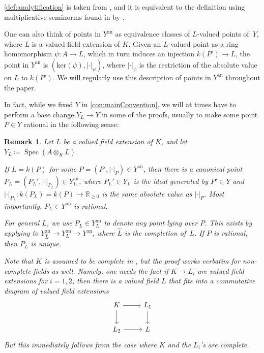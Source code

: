 \documentclass[12pt,reqno,a4paper]{amsart}
\theoremstyle{theoremstyle}
\theoremstyle{examplestyle}
\newtheorem{remark}[theorem]{Remark}
\theoremstyle{algorithmstyle}
\newcommand{\RR}{\mathbb{R}}
\newcommand{\an}{{\mathrm{an}}}
\DeclareMathOperator{\Spec}{Spec}
\begin{document}
\cref{def:analytification} is taken from \cite{Nicaise2016}, and it is equivalent to the definition using multiplicative seminorms found in \cite{Gubler2013,Temkin15,BPR2016} by \cite[Remark~2.2]{Gubler2013}.

One can also think of points in $Y^{\an}$ as equivalence classes of $L$-valued points of~$Y$, where $L$ is a valued field extension of $K$. Given an $L$-valued point as a ring homomorphism $\psi\colon A\to L$, which in turn induces an injection $k(P')\to L$, the point in $Y^{\an}$ is $(\mathrm{ker}(\psi), |\cdot|_\psi)$, where $|\cdot|_\psi$ is the restriction of the absolute value on $L$ to $k(P')$.  We will regularly use this description of points in $Y^\an$ throughout the paper.

%

\smallskip

In fact, while we fixed $Y$ in \cref{con:mainConvention}, we will at times have to perform a base change $Y_L\rightarrow Y$ in some of the proofs, usually to make some point $P\in Y$ rational in the following sense:

\begin{remark}
  \label{rem:RationalPoints}
  Let $L$ be a valued field extension of $K$, and let $Y_L\coloneqq\Spec(A\otimes_K L)$.

  If $L=k(P)$ for some $P=(P',|\cdot|_P)\in Y^\an$, then there is a canonical point $P_{L}=(P_L',|\cdot|_{P_L})\in{Y^{\mathrm{an}}_{L}}$, where $P_L'\in Y_L$ is the ideal generated by $P'\in Y$ and $|\cdot|_{P_L}\colon k(P_L)=k(P)\rightarrow \RR_{\geq 0}$ is the same absolute value as $|\cdot|_{P}$.  Most importantly, $P_L\in Y^\an$ is rational.

  For general $L$, we use $P_L\in Y_L^\an$ to denote any point lying over $P$. This exists by applying \cite[Lemma 2.3]{Gubler2013} to $Y^{\mathrm{an}}_{\hat{L}}\to{Y^{\mathrm{an}}_{L}}\to{Y^{\mathrm{an}}}$, where $\hat{L}$ is the completion of~$L$.  If $P$ is rational, then $P_L$ is unique.

  Note that $K$ is assumed to be complete in \cite[Lemma 2.3]{Gubler2013}, but the proof works verbatim for non-complete fields as well. Namely, one needs the fact if $K\to L_{i}$ are valued field extensions for $i=1,2$, then there is a valued field $L$ that fits into a commutative diagram of valued field extensions
\begin{equation*}
    \begin{tikzcd}
        K \arrow[r] \arrow[d] & L_{1} \arrow[d] \\
        L_{2} \arrow[r] & L
    \end{tikzcd}
\end{equation*}
But this immediately follows from the case where $K$ and the $L_{i}$'s are complete. %

\end{remark}
\end{document}
